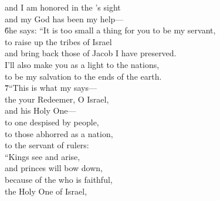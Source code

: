 \begin{poetry}
\poeml and I am honored in the 's sight \\
\poemll    and my God has been my help--- \\
\poeml \v{6}he says: ``It is too small a thing for you to be my servant, \\
\poemll    to raise up the tribes of Israel \\
\poemlll       and bring back those of Jacob I have preserved. \\
\poeml I'll also make you as a light to the nations, \\
\poemll    to be my salvation to the ends of the earth. \\
\poeml \v{7}``This is what my  says--- \\
\poemll    the  your Redeemer, O Israel, \\
\poemlll       and his Holy One--- \\
\poeml to one despised by people, \\
\poemll    to those abhorred as a nation, \\
\poemlll       to the servant of rulers: \\
\poeml ``Kings see and arise, \\
\poemll    and princes will bow down, \\
\poeml because of the  who is faithful, \\
\poemll    the Holy One of Israel, \\

\end{poetry}
